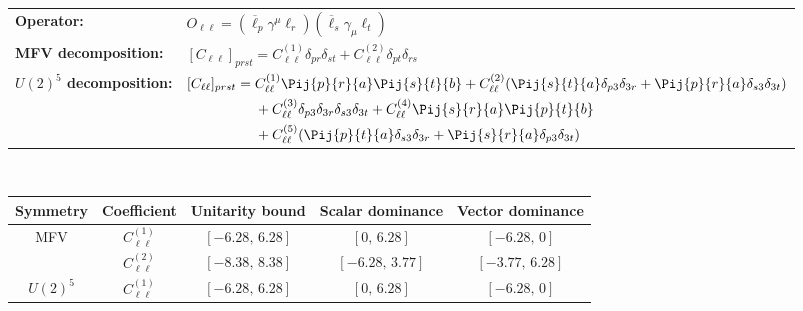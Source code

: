 \begin{table}[tbp]
\centering
{\small
\begin{tabular}{ll}
    \textbf{Operator:} & $\boxed{O_{\ell\ell} = (\overline\ell_p \gamma^\mu \ell_r)(\overline\ell_s \gamma_\mu \ell_t)}$ \\[0.2cm]
    \textbf{MFV decomposition:} &
        $[C_{\ell\ell}]_{prst} = C_{\ell\ell}^{(1)}\delta_{pr}\delta_{st} + C_{\ell\ell}^{(2)}\delta_{pt}\delta_{rs}$ \\[0.15cm]
    \textbf{$U(2)^5$ decomposition:} &
        $[C_{\ell\ell}]_{prst} =
            C_{\ell\ell}^{(1)}\Pij{p}{r}{a}\Pij{s}{t}{b}
            + C_{\ell\ell}^{(2)}(\Pij{s}{t}{a}\delta_{p3}\delta_{3r} + \Pij{p}{r}{a}\delta_{s3}\delta_{3t})$ \\
        & $\phantom{[C_{\ell\ell}]_{prst} ={}}
            + C_{\ell\ell}^{(3)}\delta_{p3}\delta_{3r}\delta_{s3}\delta_{3t}
            + C_{\ell\ell}^{(4)}\Pij{s}{r}{a}\Pij{p}{t}{b}
            $ \\
        & $\phantom{[C_{\ell\ell}]_{prst} ={}}+ C_{\ell\ell}^{(5)}(\Pij{p}{t}{a}\delta_{s3}\delta_{3r} + \Pij{s}{r}{a}\delta_{p3}\delta_{3t})$ \\
\end{tabular}
\\[0.3cm]
\renewcommand{\arraystretch}{1.3}
\begin{tabular}{ccccc}
    \toprule
    \rowcolor{hdrcolor}
    \textbf{Symmetry} & \textbf{Coefficient}
        & \textbf{Unitarity bound}
        & \textbf{Scalar dominance}
        & \textbf{Vector dominance} \\
    \midrule
    \multirow{2}{*}{MFV}
        & $C_{\ell\ell}^{(1)}$ & $[-6.28,\, 6.28]$ & $[0,\, 6.28]$      & $[-6.28,\, 0]$    \\
        & $C_{\ell\ell}^{(2)}$ & $[-8.38,\, 8.38]$ & $[-6.28,\, 3.77]$  & $[-3.77,\, 6.28]$ \\
    \midrule
    \multirow{5}{*}{$U(2)^5$}
        & $C_{\ell\ell}^{(1)}$ & $[-6.28,\, 6.28]$ & $[0,\, 6.28]$     & $[-6.28,\, 0]$    \\

\end{tabular}}
\end{table}
